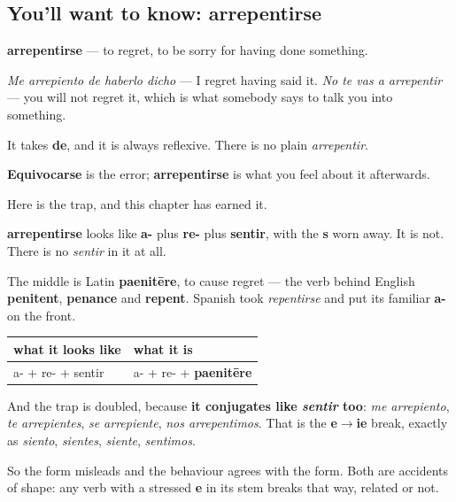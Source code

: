 \subsection*{You'll want to know: arrepentirse}
\textbf{arrepentirse} — to regret, to be sorry for having done something.

\emph{Me arrepiento de haberlo dicho} — I regret having said it. \emph{No te vas a arrepentir} — you will not regret it, which is what somebody says to talk you into something.

It takes \textbf{de}, and it is always reflexive. There is no plain \emph{arrepentir}.

\textbf{Equivocarse} is the error; \textbf{arrepentirse} is what you feel about it afterwards.

\begin{cousinweb}
Here is the trap, and this chapter has earned it.

\textbf{arrepentirse} looks like \textbf{a-} plus \textbf{re-} plus \textbf{sentir}, with the \textbf{s} worn away. It is not. There is no \emph{sentir} in it at all.

The middle is Latin \textbf{paenitēre}, to cause regret — the verb behind English \textbf{penitent}, \textbf{penance} and \textbf{repent}. Spanish took \emph{repentirse} and put its familiar \textbf{a-} on the front.

\noindent
\begin{tabularx}{\linewidth}{@{}>{\raggedright\arraybackslash}X>{\raggedright\arraybackslash}X@{}}
\toprule
\textbf{what it looks like} & \textbf{what it is} \\
\midrule
a- + re- + sentir & a- + re- + \textbf{paenitēre} \\
\bottomrule
\end{tabularx}

And the trap is doubled, because \textbf{it conjugates like \emph{sentir} too}: \emph{me arrepiento}, \emph{te arrepientes}, \emph{se arrepiente}, \emph{nos arrepentimos}. That is the \textbf{e$\to$ie} break, exactly as \emph{siento}, \emph{sientes}, \emph{siente}, \emph{sentimos}.

So the form misleads and the behaviour agrees with the form. Both are accidents of shape: any verb with a stressed \textbf{e} in its stem breaks that way, related or not.
\end{cousinweb}

